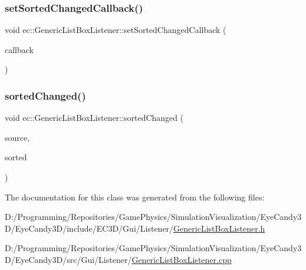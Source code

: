\mbox{\label{classec_1_1_generic_list_box_listener_adbce2672e6173f9f2b09d6ba9df09828}} 
\subsubsection{\texorpdfstring{set\+Sorted\+Changed\+Callback()}{setSortedChangedCallback()}}
{\footnotesize\ttfamily void ec\+::\+Generic\+List\+Box\+Listener\+::set\+Sorted\+Changed\+Callback (\begin{DoxyParamCaption}\item[{const \mbox{\hyperlink{classec_1_1_generic_list_box_listener_a42ecf66ec6c32bbe9fe0174b2b1a527f}{Sorted\+Changed\+\_\+\+Callback}} \&}]{callback }\end{DoxyParamCaption})}

\mbox{\label{classec_1_1_generic_list_box_listener_a52b32a361ac45c09f0a3ada6e52334d6}} 
\subsubsection{\texorpdfstring{sorted\+Changed()}{sortedChanged()}}
{\footnotesize\ttfamily void ec\+::\+Generic\+List\+Box\+Listener\+::sorted\+Changed (\begin{DoxyParamCaption}\item[{agui\+::\+List\+Box $\ast$}]{source,  }\item[{bool}]{sorted }\end{DoxyParamCaption})\hspace{0.3cm}{\ttfamily [override]}}



The documentation for this class was generated from the following files\+:\begin{DoxyCompactItemize}
\item 
D\+:/\+Programming/\+Repositories/\+Game\+Physics/\+Simulation\+Visualization/\+Eye\+Candy3\+D/\+Eye\+Candy3\+D/include/\+E\+C3\+D/\+Gui/\+Listener/\mbox{\hyperlink{_generic_list_box_listener_8h}{Generic\+List\+Box\+Listener.\+h}}\item 
D\+:/\+Programming/\+Repositories/\+Game\+Physics/\+Simulation\+Visualization/\+Eye\+Candy3\+D/\+Eye\+Candy3\+D/src/\+Gui/\+Listener/\mbox{\hyperlink{_generic_list_box_listener_8cpp}{Generic\+List\+Box\+Listener.\+cpp}}\end{DoxyCompactItemize}
